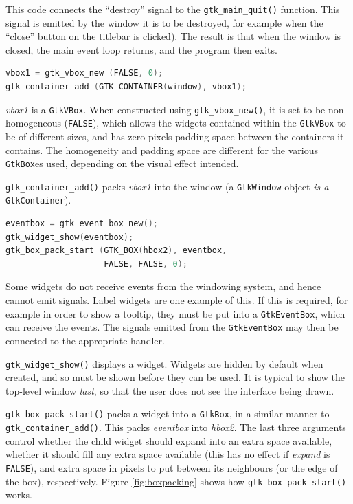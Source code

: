 \documentclass[a4paper,oneside]{article}
\newcommand{\variable}[1]{\textsl{#1}}
\newcommand{\class}[1]{\texttt{#1}}
\newcommand{\function}[1]{\texttt{#1()}}
\newcommand{\code}[1]{\texttt{#1}}
\begin{document}
This code connects the ``destroy'' signal to the
\function{gtk\_main\_quit} function.  This signal is emitted by the
window it is to be destroyed, for example when the ``close'' button on
the titlebar is clicked).  The result is that when the window is
closed, the main event loop returns, and the program then exits.

\begin{lstlisting}[numbers=none, language=C]
vbox1 = gtk_vbox_new (FALSE, 0);
gtk_container_add (GTK_CONTAINER(window), vbox1);
\end{lstlisting}

\variable{vbox1} is a \class{GtkVBox}.  When constructed using
\function{gtk\_vbox\_new}, it is set to be non-homogeneous
(\code{FALSE}), which allows the widgets contained within the
\class{GtkVBox} to be of different sizes, and has zero pixels padding
space between the containers it contains.  The homogeneity and padding
space are different for the various \class{GtkBox}es used, depending
on the visual effect intended.

\function{gtk\_container\_add} packs \variable{vbox1} into the window
(a \class{GtkWindow} object \emph{is a} \class{GtkContainer}).

\begin{lstlisting}[numbers=none, language=C]
eventbox = gtk_event_box_new();
gtk_widget_show(eventbox);
gtk_box_pack_start (GTK_BOX(hbox2), eventbox,
                    FALSE, FALSE, 0);
\end{lstlisting}

Some widgets do not receive events from the windowing system, and
hence cannot emit signals.  Label widgets are one example of this.  If
this is required, for example in order to show a tooltip, they must be
put into a \class{GtkEventBox}, which can receive the events.  The
signals emitted from the \class{GtkEventBox} may then be connected to
the appropriate handler.

\function{gtk\_widget\_show} displays a widget.  Widgets are hidden by
default when created, and so must be shown before they can be used.
It is typical to show the top-level window \emph{last}, so that the
user does not see the interface being drawn.

\function{gtk\_box\_pack\_start} packs a widget into a \class{GtkBox},
in a similar manner to \function{gtk\_container\_add}.  This packs
\variable{eventbox} into \variable{hbox2}.  The last three arguments
control whether the child widget should expand into an extra space
available, whether it should fill any extra space available (this has
no effect if \variable{expand} is \code{FALSE}), and extra space in
pixels to put between its neighbours (or the edge of the box),
respectively.  Figure \ref{fig:boxpacking} shows how
\function{gtk\_box\_pack\_start} works.
\end{document}
